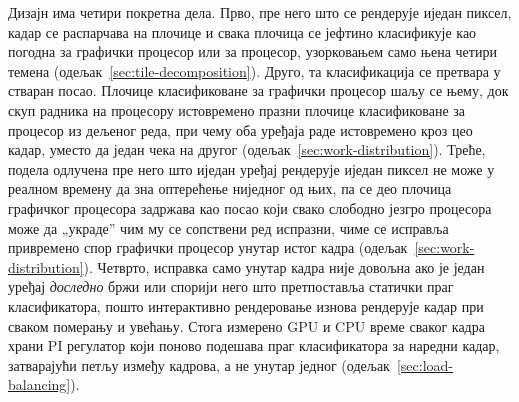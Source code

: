 \documentclass[serbian]{ftndiplomski}
\begin{document}
Дизајн има четири покретна дела. Прво, пре него што се рендерује иједан пиксел, кадар
се распарчава на плочице и свака плочица се јефтино класификује као погодна за
графички процесор или за процесор, узорковањем само њена четири темена
(одељак~\ref{sec:tile-decomposition}). Друго, та класификација се претвара у стваран
посао. Плочице класификоване за графички процесор шаљу се њему, док скуп радника на
процесору истовремено празни плочице класификоване за процесор из дељеног реда, при
чему оба уређаја раде истовремено кроз цео кадар, уместо да један чека на другог
(одељак~\ref{sec:work-distribution}). Треће, подела одлучена пре него што иједан
уређај рендерује иједан пиксел не може у реалном времену да зна оптерећење ниједног од
њих, па се део плочица графичког процесора задржава као посао који свако слободно
језгро процесора може да „украде'' чим му се сопствени ред испразни, чиме се
исправља привремено спор графички процесор унутар истог кадра
(одељак~\ref{sec:work-distribution}). Четврто, исправка само унутар кадра није
довољна ако је један уређај \emph{доследно} бржи или спорији него што претпоставља
статички праг класификатора, пошто интерактивно рендеровање изнова рендерује кадар при
сваком померању и увећању. Стога измерено GPU и CPU време сваког кадра храни PI
регулатор који поново подешава праг класификатора за наредни кадар, затварајући петљу
између кадрова, а не унутар једног (одељак~\ref{sec:load-balancing}).
\end{document}
